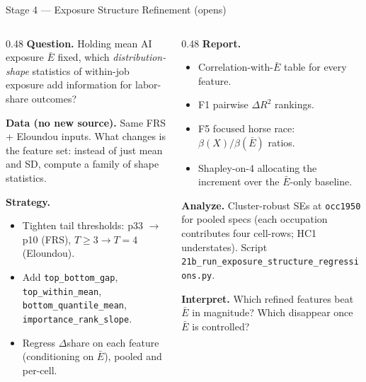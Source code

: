 \documentclass[10pt,english,aspectratio=169]{beamer}
\begin{document}
\begin{frame}{Stage 4 --- Exposure Structure Refinement (opens)}
\begin{columns}[T]
\begin{column}{0.48\textwidth}
\textbf{Question.} Holding mean AI exposure $\bar E$ fixed, which \emph{distribution-shape} statistics of within-job exposure add information for labor-share outcomes?

\vspace{0.1cm}
\textbf{Data (no new source).} Same FRS + Eloundou inputs. What changes is the feature set: instead of just mean and SD, compute a family of shape statistics.

\vspace{0.1cm}
\textbf{Strategy.}
\begin{itemize}\scriptsize
  \item Tighten tail thresholds: p33 $\to$ p10 (FRS), $T\ge 3 \to T=4$ (Eloundou).
  \item Add \texttt{top\_bottom\_gap}, \texttt{top\_within\_mean}, \texttt{bottom\_quantile\_mean}, \texttt{importance\_rank\_slope}.
  \item Regress $\Delta$share on each feature (conditioning on $\bar E$), pooled and per-cell.
\end{itemize}
\end{column}
\begin{column}{0.48\textwidth}
\textbf{Report.}
\begin{itemize}\scriptsize
  \item Correlation-with-$\bar E$ table for every feature.
  \item F1 pairwise $\Delta R^2$ rankings.
  \item F5 focused horse race: $\beta(X) / \beta(\bar E)$ ratios.
  \item Shapley-on-4 allocating the increment over the $\bar E$-only baseline.
\end{itemize}

\vspace{0.1cm}
\textbf{Analyze.} Cluster-robust SEs at \texttt{occ1950} for pooled specs (each occupation contributes four cell-rows; HC1 understates). Script \texttt{21b\_run\_exposure\_structure\_regressions.py}.

\vspace{0.1cm}
\textbf{Interpret.} Which refined features beat $\bar E$ in magnitude? Which disappear once $\bar E$ is controlled?
\end{column}
\end{columns}
\end{frame}
\end{document}
